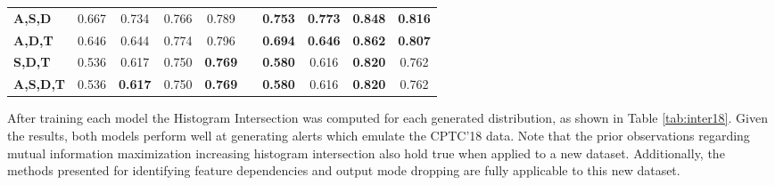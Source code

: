\begin{table}[!htbp]
\begin{adjustbox}{angle=90}
\begin{tabular}{l|c|c|c|c|c|c|c|c|c|}
			\textbf{A,S,D} & 0.667 & 0.734 & 0.766 & 0.789 &  & \textbf{0.753} & \textbf{0.773} & \textbf{0.848} & \textbf{0.816} \\
			\textbf{A,D,T} & 0.646 & 0.644 & 0.774 & 0.796 &  & \textbf{0.694} & \textbf{0.646} & \textbf{0.862} & \textbf{0.807} \\
			\textbf{S,D,T} & 0.536 & 0.617 & 0.750 & \textbf{0.769} &  & \textbf{0.580} & 0.616 & \textbf{0.820} & 0.762 \\ \hline
			\textbf{A,S,D,T} & 0.536 & \textbf{0.617} & 0.750 & \textbf{0.769} &  & \textbf{0.580} & 0.616 & \textbf{0.820} & 0.762
		\end{tabular}
	\end{adjustbox}
\end{table}


After training each model the Histogram Intersection was computed for each generated distribution, as shown in Table \ref{tab:inter18}. Given the results, both models perform well at generating alerts which emulate the CPTC'18 data. Note that the prior observations regarding mutual information maximization increasing histogram intersection also hold true when applied to a new dataset. Additionally, the methods presented for identifying feature dependencies and output mode dropping are fully applicable to this new dataset. 


